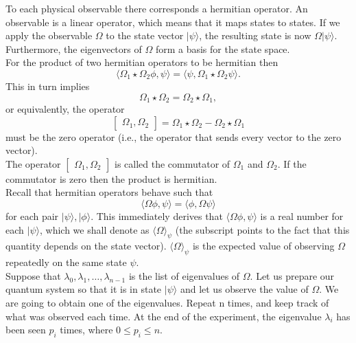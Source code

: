 \documentclass{article}
\begin{document}
To each physical observable there corresponds a hermitian operator. An observable is a linear operator, which means that it maps states to states. If we apply the observable $\Omega$ to the state vector $|\psi\rangle$, the resulting state is now $\Omega|\psi\rangle$. Furthermore, the eigenvectors of $\Omega$ form a basis for the state space.\\

For the product of two hermitian operators to be hermitian then 
\begin{equation}
    \langle\Omega_1 \star \Omega_2\phi, \psi\rangle = \langle \psi, \Omega_1 \star \Omega_2\psi\rangle.
\end{equation}
This in turn implies
\begin{equation} 
\Omega_1 \star \Omega_2 = \Omega_2 \star \Omega_1,
\end{equation}
or equivalently, the operator
\begin{equation}
\begin{bmatrix}\Omega_1, \Omega_2\end{bmatrix} = \Omega_1 \star \Omega_2 - \Omega_2 \star \Omega_1
\end{equation}
must be the zero operator (i.e., the operator that sends every vector to the zero vector).\\

The operator $\begin{bmatrix}\Omega_1, \Omega_2\end{bmatrix}$ is called the commutator of $\Omega_1$ and $\Omega_2$. If the commutator is zero then the product is hermitian. \\

Recall that hermitian operators behave such that
\begin{equation}
    \langle\Omega\phi, \psi\rangle = \langle\phi, \Omega\psi\rangle
\end{equation}
for each pair $|\psi\rangle, |\phi\rangle$. This immediately derives that $\langle\Omega\phi, \psi\rangle$ is a real number for each $|\psi\rangle$, which we shall denote as $\langle\Omega\rangle_\psi$ (the subscript points to the fact that this quantity depends on the state vector). $\langle\Omega\rangle_\psi$ is the expected value of observing $\Omega$ repeatedly on the same state $\psi$.\\

Suppose that $\lambda_0, \lambda_1, \ldots, \lambda_{n-1}$ is the list of eigenvalues of $\Omega$. Let us prepare our quantum system so that it is in state $|\psi\rangle$ and let us observe the value of $\Omega$. We are going to obtain one of the eigenvalues. Repeat n times, and keep track of what was observed each time. At the end of the experiment, the eigenvalue $\lambda_i$ has been seen $p_i$ times, where $0 \leq p_i \leq n$.\\
\end{document}
